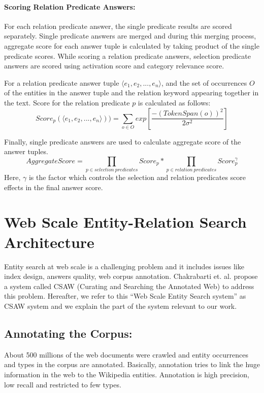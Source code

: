 \documentclass[11pt]{report}
\begin{document}
\subsubsection*{Scoring Relation Predicate Answers:}
For each relation predicate answer, the single predicate results are scored separately. Single predicate answers are merged and during
this merging process, aggregate score for each answer tuple is calculated by taking product of the single predicate scores. 
While scoring a relation predicate answers, selection predicate answers are scored using activation score and category relevance score. 

For a relation predicate answer tuple $\langle e_1, e_2,..., e_n\rangle$, and the set of occurrences $O$ of the entities
in the answer tuple and the relation keyword appearing together in the text. Score for the relation predicate $p$
is calculated as follows:
\begin{equation}
 Score_p(\langle e_1, e_2,..., e_n \rangle)) = \sum_{o \in O} exp[\frac{-(TokenSpan(o))^2}{2\sigma^2}]
\end{equation}

Finally, single predicate answers are used to calculate aggregate score of the answer tuples. 
\begin{equation}
 Aggregate Score = \prod_{p \in selection\ predicates} Score_p * \prod_{p \in relation\ predicates} Score_p^{\gamma}
\end{equation}
Here, $\gamma$ is the factor which controls the selection and relation predicates score effects in the final answer score.

\chapter{Web Scale Entity-Relation Search Architecture}
Entity search at web scale is a challenging problem and it includes issues like index design, answers quality, web corpus annotation.
Chakrabarti et. al. \cite{csaw} propose a system called CSAW (Curating and Searching the Annotated Web) to address this problem.
Hereafter, we refer to this ``Web Scale Entity Search system'' as CSAW system and we explain the part of the
system relevant to our work.
\section{Annotating the Corpus:}
About 500 millions of the web documents were crawled and entity occurrences and types in the corpus are annotated. Basically, annotation tries
to link the huge information in the web to the Wikipedia entities. Annotation is high precision, low recall and restricted to few types. 
\end{document}
